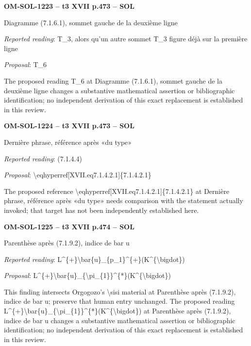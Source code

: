 \par\noindent\textbf{OM-SOL-1223 -- t3 XVII p.473 -- SOL}\par
Diagramme (7.1.6.1), sommet gauche de la deuxième ligne\par
\emph{Reported reading}: T\_3, alors qu'un autre sommet T\_3 figure déjà sur la première ligne\par
\emph{Proposal}: T\_6\par
The proposed reading T\_6 at Diagramme (7.1.6.1), sommet gauche de la deuxième ligne changes a substantive mathematical assertion or bibliographic identification; no independent derivation of this exact replacement is established in this review.\par
\par\noindent\textbf{OM-SOL-1224 -- t3 XVII p.473 -- SOL}\par
Dernière phrase, référence après «du type»\par
\emph{Reported reading}: (7.1.4.4)\par
\emph{Proposal}: \textbackslash{}eqhyperref[XVII.eq7.1.4.2.1]\{7.1.4.2.1\}\par
The proposed reference \textbackslash{}eqhyperref[XVII.eq7.1.4.2.1]\{7.1.4.2.1\} at Dernière phrase, référence après «du type» needs comparison with the statement actually invoked; that target has not been independently established here.\par
\par\noindent\textbf{OM-SOL-1225 -- t3 XVII p.474 -- SOL}\par
Parenthèse après (7.1.9.2), indice de bar u\par
\emph{Reported reading}: L\textasciicircum{}\{+\}\textbackslash{}bar\{u\}\_\{p\_1\}\textasciicircum{}\{+\}(K\textasciicircum{}\{\textbackslash{}bigdot\})\par
\emph{Proposal}: L\textasciicircum{}\{+\}\textbackslash{}bar\{u\}\_\{\textbackslash{}pi\_\{1\}\}\textasciicircum{}\{*\}(K\textasciicircum{}\{\textbackslash{}bigdot\})\par
This finding intersects Orgogozo's \textbackslash{}sisi material at Parenthèse après (7.1.9.2), indice de bar u; preserve that human entry unchanged. The proposed reading L\textasciicircum{}\{+\}\textbackslash{}bar\{u\}\_\{\textbackslash{}pi\_\{1\}\}\textasciicircum{}\{*\}(K\textasciicircum{}\{\textbackslash{}bigdot\}) at Parenthèse après (7.1.9.2), indice de bar u changes a substantive mathematical assertion or bibliographic identification; no independent derivation of this exact replacement is established in this review.\par
